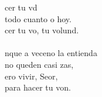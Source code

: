 \begin{cancion}%
	cer tu vd \\
	 todo cuanto o hoy.\\
	cer tu vo, tu volund.\\
	\jump\\
	nque a veceno la entienda\\
	no queden casi zas,\\
	ero vivir, Seor,\\
	para hacer tu von.\\
\end{cancion}%

